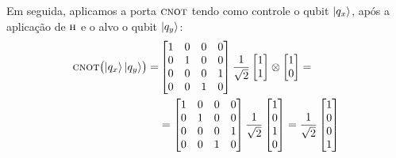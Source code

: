 Em seguida, aplicamos a porta \(\operatorname{\textsc{cnot}}\) tendo como controle o qubit $\ket{q_x}$, após a aplicação de \(\operatorname{\textsc{h}}\) e o alvo o qubit $\ket{q_y}$:
\begin{equation}\label{eq:matrizbell00}
	\begin{split}
 		\CNOT \bigl( \ket{q_x}\ket{q_y} \bigr) =& 
		\begin{bmatrix}
		1 & 0 & 0 & 0 \\
		0 & 1 & 0 & 0 \\
		0 & 0 & 0 & 1 \\
		0 & 0 & 1 & 0
		\end{bmatrix}
		\frac{1}{\sqrt{2}} \begin{bmatrix*}[r]
		1 \\
		1
		\end{bmatrix*} \otimes  \begin{bmatrix*}[r]
		1 \\
		0
		\end{bmatrix*} = \\
		&= \begin{bmatrix}
		1 & 0 & 0 & 0 \\
		0 & 1 & 0 & 0 \\
		0 & 0 & 0 & 1 \\
		0 & 0 & 1 & 0
		\end{bmatrix} \frac{1}{\sqrt{2}}\begin{bmatrix}
		1 \\
		0 \\
		1 \\
		0
		\end{bmatrix} = \frac{1}{\sqrt{2}} \begin{bmatrix}
		1 \\
		0 \\
		0 \\
		1
		\end{bmatrix}
	\end{split}	
\end{equation}

